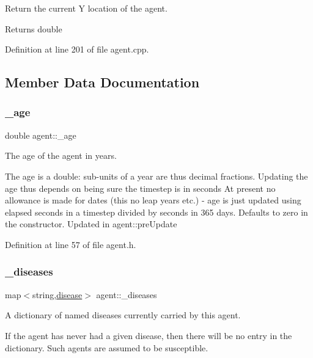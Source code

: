 Return the current Y location of the agent. 

\begin{DoxyReturn}{Returns}
double 
\end{DoxyReturn}


Definition at line 201 of file agent.\+cpp.



\subsection{Member Data Documentation}
\mbox{\label{classagent_a9c76eb9369864fb60a2d5a4f44c56843}} 
\subsubsection{\texorpdfstring{\+\_\+age}{\_age}}
{\footnotesize\ttfamily double agent\+::\+\_\+age}



The age of the agent in years. 

The age is a double\+: sub-\/units of a year are thus decimal fractions. Updating the age thus depends on being sure the timestep is in seconds At present no allowance is made for dates (this no leap years etc.) -\/ age is just updated using elapsed seconds in a timestep divided by seconds in 365 days. Defaults to zero in the constructor. Updated in agent\+::pre\+Update 

Definition at line 57 of file agent.\+h.

\mbox{\label{classagent_a2352342e95bc77041c07c0dafdfb7cd2}} 
\subsubsection{\texorpdfstring{\+\_\+diseases}{\_diseases}}
{\footnotesize\ttfamily map$<$string,\mbox{\hyperlink{classdisease}{disease}}$>$ agent\+::\+\_\+diseases}



A dictionary of named diseases currently carried by this agent. 

If the agent has never had a given disease, then there will be no entry in the dictionary. Such agents are assumed to be susceptible. 

